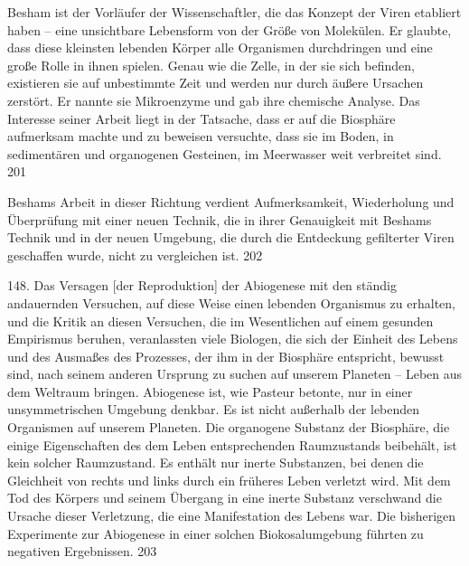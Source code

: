 \documentclass[11pt,a4paper]{book}
\begin{document}
Besham ist der Vorläufer der Wissenschaftler, die das Konzept der Viren etabliert haben -- eine unsichtbare Lebensform von der Größe von Molekülen. Er glaubte, dass diese kleinsten lebenden Körper alle Organismen durchdringen und eine große Rolle in ihnen spielen. Genau wie die Zelle, in der sie sich befinden, existieren sie auf unbestimmte Zeit und werden nur durch äußere Ursachen zerstört. Er nannte sie Mikroenzyme und gab ihre chemische Analyse. Das Interesse seiner Arbeit liegt in der Tatsache, dass er auf die Biosphäre aufmerksam machte und zu beweisen versuchte, dass sie im Boden, in sedimentären und organogenen Gesteinen, im Meerwasser weit verbreitet sind. 201



Beshams Arbeit in dieser Richtung verdient Aufmerksamkeit, Wiederholung und Überprüfung mit einer neuen Technik, die in ihrer Genauigkeit mit Beshams Technik und in der neuen Umgebung, die durch die Entdeckung gefilterter Viren geschaffen wurde, nicht zu vergleichen ist. 202



148. Das Versagen [der Reproduktion] der Abiogenese mit den ständig andauernden Versuchen, auf diese Weise einen lebenden Organismus zu erhalten, und die Kritik an diesen Versuchen, die im Wesentlichen auf einem gesunden Empirismus beruhen, veranlassten viele Biologen, die sich der Einheit des Lebens und des Ausmaßes des Prozesses, der ihm in der Biosphäre entspricht, bewusst sind, nach seinem anderen Ursprung zu suchen auf unserem Planeten -- Leben aus dem Weltraum bringen. Abiogenese ist, wie Pasteur betonte, nur in einer unsymmetrischen Umgebung denkbar. Es ist nicht außerhalb der lebenden Organismen auf unserem Planeten. Die organogene Substanz der Biosphäre, die einige Eigenschaften des dem Leben entsprechenden Raumzustands beibehält, ist kein solcher Raumzustand. Es enthält nur inerte Substanzen, bei denen die Gleichheit von rechts und links durch ein früheres Leben verletzt wird. Mit dem Tod des Körpers und seinem Übergang in eine inerte Substanz verschwand die Ursache dieser Verletzung, die eine Manifestation des Lebens war. Die bisherigen Experimente zur Abiogenese in einer solchen Biokosalumgebung führten zu negativen Ergebnissen. 203
\end{document}
